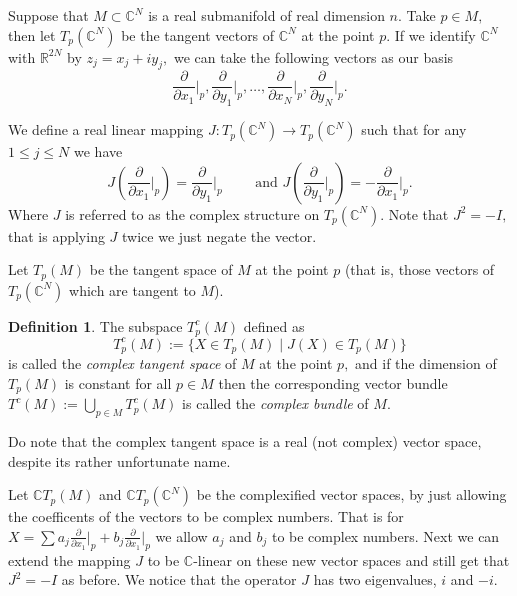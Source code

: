 \documentclass[12pt]{article}
\theoremstyle{theorem}
\theoremstyle{definition}
\newtheorem*{defn}{Definition}
\begin{document}
Suppose that $M \subset {\mathbb{C}}^N$ is a real submanifold of real dimension $n.$  Take $p \in M,$ then let $T_p({\mathbb{C}}^N)$ be the tangent vectors of ${\mathbb{C}}^N$ at the point $p.$  If we identify ${\mathbb{C}}^N$ with
${\mathbb{R}}^{2N}$ by $z_j = x_j + i y_j,$ we can take the following vectors as our basis
\begin{equation*}
\frac{\partial}{\partial x_1} \Bigg\rvert_p,
\frac{\partial}{\partial y_1} \Bigg\rvert_p,
\ldots,
\frac{\partial}{\partial x_N} \Bigg\rvert_p,
\frac{\partial}{\partial y_N} \Bigg\rvert_p .
\end{equation*} 

We define a real linear mapping $J\colon T_p({\mathbb{C}}^N) \to T_p({\mathbb{C}}^N)$ such that for any $1 \leq j \leq N$ we have
\begin{equation*}
J \left(
\frac{\partial}{\partial x_1} \Bigg\rvert_p
\right)
= \frac{\partial}{\partial y_1} \Bigg\rvert_p
\qquad \text{ and }
J \left(
\frac{\partial}{\partial y_1} \Bigg\rvert_p
\right)
= - \frac{\partial}{\partial x_1} \Bigg\rvert_p .
\end{equation*}
Where $J$ is referred to as the complex structure on $T_p({\mathbb{C}}^N).$  Note that $J^2 = -I,$ that is applying $J$ twice we just negate the vector.

Let $T_p(M)$ be the tangent space of $M$ at the point $p$ (that is, those vectors of $T_p({\mathbb{C}}^N)$ which are tangent to $M$).

\begin{defn}
The subspace $T_p^c(M)$ defined as
\begin{equation*}
T_p^c(M) := \{ X \in T_p(M) \mid J(X) \in T_p(M) \}
\end{equation*}
is called the {\em complex tangent space} of $M$ at the point $p,$ and if the dimension of $T_p(M)$ is constant for all
$p \in M$ then the
corresponding vector bundle $T^c(M) := \bigcup_{p\in M} T_p^c(M)$ is called the {\em complex bundle} of $M$.
\end{defn}

Do note that the complex tangent space is a real (not complex) vector space, despite its rather unfortunate name.

Let ${\mathbb{C}} T_p(M)$ and ${\mathbb{C}} T_p({\mathbb{C}}^N)$ be the complexified vector spaces, by just allowing the coefficents of the vectors to
be complex numbers.  That is for 
$X = \sum a_j \frac{\partial}{\partial x_1} \Big\rvert_p + b_j \frac{\partial}{\partial x_1} \Big\rvert_p$ we allow $a_j$ and $b_j$ to be complex numbers.  Next we can extend the mapping $J$ to be ${\mathbb{C}}$-linear on these new vector spaces and still get that $J^2 = -I$ as before.  We notice
that the operator $J$ has two eigenvalues, $i$ and $-i$.
\end{document}
